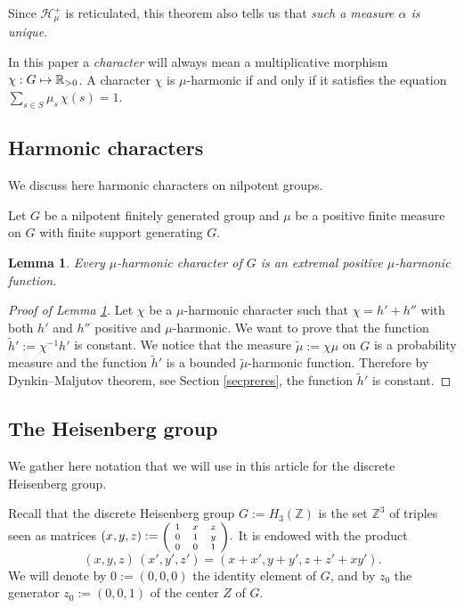 \documentclass[JEP,XML,SOM,Unicode]{cedram}
\let\mathcal\mathscr
\def\mto{\mathchoice{\longmapsto}{\mapsto}{\mapsto}{\mapsto}}
\newtheorem{Lem}[Thm]{Lemma}
\theoremstyle{definition}
\newcommand{\m}[1]{\mathbb{ #1}}
\newcommand{\mc}[1]{\mathcal{ #1}}
\let\al\alpha
\let\bq\relax
\let\eq\relax
\begin{document}
Since $\mc H_\mu^+$ is reticulated,
this theorem also tells us that \emph{such a measure $\al$ is unique.}

In this paper a \emph{character}
will always mean a multiplicative morphism $\chi:G\mto \m R_{>0}$.
A character $\chi$ is $\mu$-harmonic if and only if it satisfies
the equation $\sum_{s\in S} \mu_s\,\chi(s)=1$.

\subsection{Harmonic characters}
\bq
We discuss here harmonic characters on nilpotent groups.
\eq

Let $G$ be a nilpotent finitely generated group
and $\mu$ be a positive finite measure on $G$
with finite support generating $G$.

\begin{Lem}
\label{lemcarext}
Every $\mu$-harmonic character of $G$ is an extremal
positive $\mu$-harmonic function.
\end{Lem}

\begin{proof}[Proof of Lemma \ref{lemcarext}]
Let $\chi$ be a $\mu$-harmonic character
such that $\chi=h'+h''$
with both $h'$ and $h''$
positive and $\mu$-harmonic.
We want to prove that the function $\widetilde{h}':=\chi^{-1}h'$
is constant.
We notice that the measure $\widetilde\mu:=\chi\mu$ on $G$
is a probability measure and the function $\widetilde h'$
is a bounded $\widetilde\mu$-harmonic function.
Therefore by Dynkin--Maljutov theorem,
see Section \ref{secpreres}, the function $\widetilde h'$ is constant.
\end{proof}

\subsection{The Heisenberg group}
\label{secheigro}

\bq
We gather here notation that we will use in this article
for the discrete Heisenberg group.
\eq

Recall that the discrete Heisenberg group $G:=H_3(\m Z)$ is the set $\m Z^3$
of triples seen as matrices
$(x,y,z):=\mbox{\scriptsize
$\left(\!
\begin{array}{ccc} 1 &x&z \\
0 &1&y\\
0&0&1
\end{array}\!
\right)$}.
$
It is endowed with the product
\begin{equation}
\label{eqnprohei}
(x,y,z)\, (x',y',z')= (x+x',y+y',z+z'+xy').
\end{equation}
We will denote by $0:=(0,0,0)$ the identity element of $G$,
and by $z_0$ the generator $z_0:=(0,0,1)$ of the center $Z$ of $G$.
\end{document}
